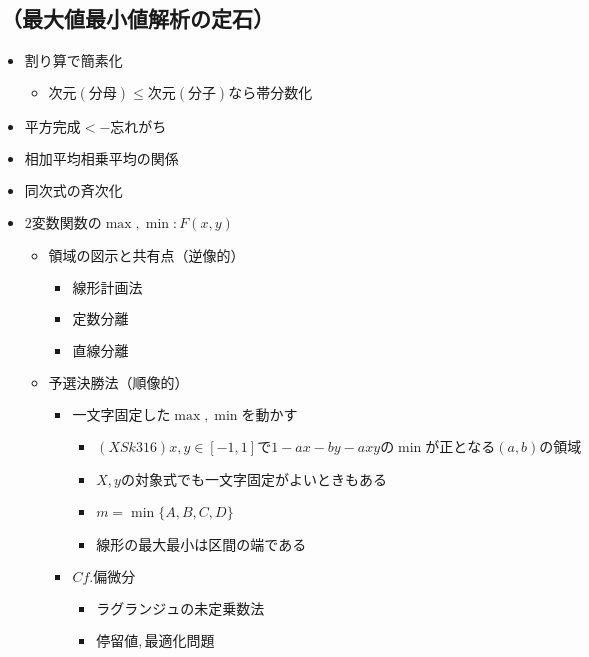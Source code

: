 \documentclass[dvipdfmx,uplatex]{jsarticle}
\begin{document}
\subsection{（最大値最小値解析の定石）}
\begin{itemize}
	\item $ 割り算で簡素化$
	\begin{itemize}
		\item $ 次元(分母) \leq 次元(分子) なら帯分数化$
	\end{itemize}
	\item $ 平方完成 <-忘れがち$
	\item $ 相加平均相乗平均の関係$
	\item $ 同次式の斉次化$
	\item $ 2変数関数の \max , \min : F(x,y)$
	\begin{itemize}
		\item $ 領域の図示と共有点（逆像的）$
		\begin{itemize}
			\item $ 線形計画法$
			\item $ 定数分離$
			\item $ 直線分離$
		\end{itemize}
		\item $ 予選決勝法（順像的）$
		\begin{itemize}
			\item $ 一文字固定した \max , \min を動かす$
			\begin{itemize}
				\item $ (XSk316) x,y \in [-1,1]で 1-ax-by-axy の \min が正となる(a,b)の領域$
				\item $ X,yの対象式でも一文字固定がよいときもある$
				\item $ m = \min \{A, B, C, D\}$
				\item $ 線形の最大最小は区間の端である$
			\end{itemize}
			\item $ Cf. 偏微分$
			\begin{itemize}
				\item $ ラグランジュの未定乗数法$
				\item $ 停留値,最適化問題$
			\end{itemize}
		\end{itemize}
	\end{itemize}
\end{itemize}
\end{document}
